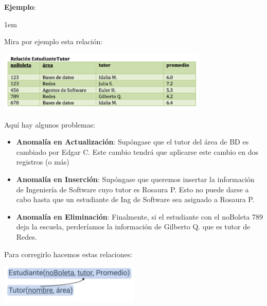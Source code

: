 \documentclass[12pt, fleqn]{report}                             %
\newenvironment{SmallIndentation}[1][0.75em]                    %
    {\begin{adjustwidth}{#1}{}\begin{footnotesize}}                 %
    {\end{footnotesize}\end{adjustwidth}}                           %
\begin{document}
                \textbf{Ejemplo}:
                \begin{SmallIndentation}[1em]
                    
                    Mira por ejemplo esta relación:
                    
                    \includegraphics[width=0.75\textwidth]{EjemploParaFNBC}

                    Aquí hay algunos problemas:
                    \begin{itemize}
                        \item
                            \textbf{Anomalía en Actualización}:
                            Supóngase que el tutor del área de BD es cambiado por Edgar C.
                            Este cambio tendrá que aplicarse este cambio en dos registros (o más)

                        \item
                            \textbf{Anomalía en Inserción}:
                            Supóngase que queremos insertar la información de Ingeniería de Software
                            cuyo tutor es Rosaura P. Esto no puede darse a cabo hasta que un
                            estudiante de Ing de Software sea asignado a Rosaura P.

                        \item
                            \textbf{Anomalía en Eliminación}:
                            Finalmente, si el estudiante con el noBoleta 789 deja la escuela, perderíamos
                            la información de Gilberto Q. que es tutor de Redes.
                    \end{itemize}

                    Para corregirlo hacemos estas relaciones:

                    \includegraphics[width=0.50\textwidth]{EjemploParaFNBC2}

                \end{SmallIndentation}
                    
\end{document}
